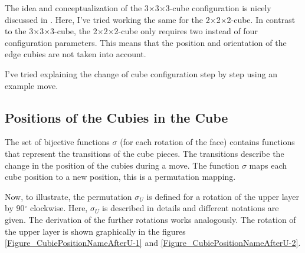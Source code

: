\documentclass[12pt,a4paper]{article}
\theoremstyle{custom}
\newcommand{\Ttwo}{2$\times$2$\times$2-}
\newcommand{\Tthree}{3$\times$3$\times$3-}
\begin{document}
The idea and conceptualization of the \Tthree cube configuration is nicely discussed in \cite{JC,lutterworth}. Here, I've tried working the same for the \Ttwo cube. In contrast to the \Tthree cube, the \Ttwo cube only requires two instead of four configuration parameters. This means that the position and orientation of the edge cubies are not taken into account.

I've tried explaining the change of cube configuration step by step using an example move.

\subsection{Positions of the Cubies in the Cube}

\label{Section_PositionsOfThecubiesInTheCube}

The set of bijective functions $\sigma$ (for each rotation of the face) contains functions that represent the transitions of the cube pieces. The transitions describe the change in the position of the cubies during a move. The function $\sigma$ maps each cube position to a new position, this is a permutation mapping.


Now, to illustrate, the permutation $\sigma_U$ is defined for a rotation of the upper layer by 90$^\circ$ clockwise. 
Here, $\sigma_U$ is described in details and different notations are given. The derivation of the further rotations works analogously.
The rotation of the upper layer is shown graphically in the figures \ref{Figure_CubiePositionNameAfterU-1} and \ref{Figure_CubiePositionNameAfterU-2}.
\end{document}
